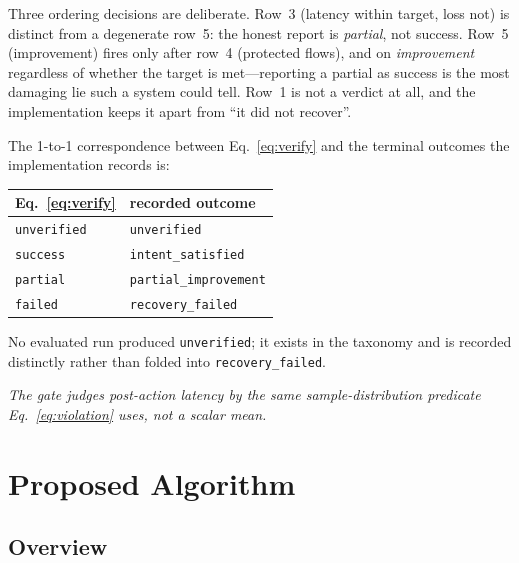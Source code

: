\documentclass[conference]{IEEEtran}
\begin{document}
Three ordering decisions are deliberate. Row~3 (latency within target, loss
not) is distinct from a degenerate row~5: the honest report is \emph{partial},
not success. Row~5 (improvement) fires only after row~4 (protected flows), and
on \emph{improvement} regardless of whether the target is met---reporting a
partial as success is the most damaging lie such a system could tell. Row~1 is
not a verdict at all, and the implementation keeps it apart from
``it did not recover''.

The 1-to-1 correspondence between Eq.~\eqref{eq:verify} and the terminal
outcomes the implementation records is:
\begin{center}
\footnotesize
\begin{tabular}{ll}
\toprule
Eq.~\eqref{eq:verify} & recorded outcome \\
\midrule
\texttt{unverified} & \texttt{unverified} \\
\texttt{success}    & \texttt{intent\_satisfied} \\
\texttt{partial}    & \texttt{partial\_improvement} \\
\texttt{failed}     & \texttt{recovery\_failed} \\
\bottomrule
\end{tabular}
\end{center}
No evaluated run produced \texttt{unverified}; it exists in the taxonomy and
is recorded distinctly rather than folded into \texttt{recovery\_failed}.

\emph{The gate judges post-action latency by the same
sample-distribution predicate Eq.~\eqref{eq:violation} uses, not a scalar
mean.}

\section{Proposed Algorithm}

\subsection{Overview}
\end{document}
